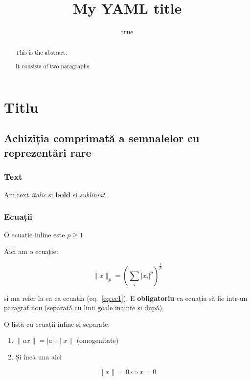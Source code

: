 \documentclass[]{article}
\title{My YAML title}
\author{true}
\date{}
\begin{document}
\maketitle
\begin{abstract}
This is the abstract.

It consists of two paragraphs.
\end{abstract}

\section{Titlu}\label{titlu}

\subsection{Achiziția comprimată a semnalelor cu reprezentări
rare}\label{sec:stateart}

\subsubsection{Text}\label{text}

Am text \emph{italic} si \textbf{bold} si \emph{subliniat}.

\subsubsection{Ecuații}\label{sec:ecuatii}

O ecuație inline este \(p \geq 1\)

Aici am o ecuație:

\begin{equation}
 \|x\|_p = \left( \sum_i |x_i|^p \right) ^\frac{1}{p}
\label{eq:ec1}\end{equation}

si ma refer la ea ca ecuatia (eq.~\ref{eq:ec1}). E \textbf{obligatoriu}
ca ecuația să fie intr-un paragraf nou (separată cu linii goale inainte
și după),

O listă cu ecuații inline si separate:

\begin{enumerate}
\def\labelenumi{\arabic{enumi}.}
\item
  \(\|ax\| = |a| \cdot \|x\|\) (omogenitate)
\item
  Și încă una aici
\end{enumerate}

\begin{equation}\|x\| = 0 \iff x=0\label{eq:ec2}\end{equation}
\end{document}
